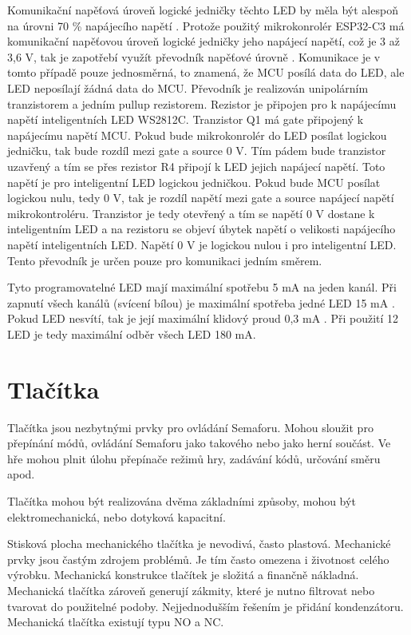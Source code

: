 Komunikační napěťová úroveň logické jedničky těchto LED by měla být alespoň na úrovni 70 \% napájecího napětí \cite{WS2812C_dtsh}. 
Protože použitý mikrokonrolér ESP32-C3 má komunikační napěťovou úroveň logické jedničky jeho napájecí napětí, což je 3 až 3,6 V, 
tak je zapotřebí využít převodník napěťové úrovně \cite{ESP_C3_dtsh}. Komunikace je v tomto případě pouze jednosměrná, 
to znamená, že MCU posílá data do LED, ale LED neposílají žádná data do MCU. Převodník je realizován unipolárním tranzistorem 
a jedním pullup rezistorem. Rezistor je připojen pro k napájecímu napětí inteligentních LED WS2812C. 
Tranzistor Q1 má gate připojený k napájecímu napětí MCU. Pokud bude mikrokonrolér do LED posílat logickou jedničku, tak bude rozdíl
mezi gate a source 0 V. Tím pádem bude tranzistor uzavřený a tím se přes rezistor R4 připojí k LED jejich napájecí napětí. Toto napětí 
je pro inteligentní LED logickou jedničkou. Pokud bude MCU posílat logickou nulu, tedy 0 V, tak je rozdíl napětí mezi gate a source 
napájecí napětí mikrokontroléru. Tranzistor je tedy otevřený a tím se napětí 0 V dostane k inteligentním LED a na rezistoru se objeví
úbytek napětí o velikosti napájecího napětí inteligentních LED. Napětí 0 V je logickou nulou i pro inteligentní LED. Tento převodník
je určen pouze pro komunikaci jedním směrem. 


Tyto programovatelné LED mají maximální spotřebu 5 mA na jeden kanál. Při zapnutí všech kanálů (svícení bílou) je maximální
spotřeba jedné LED 15 mA \cite{WS2812C_dtsh}. Pokud LED nesvítí, tak je její maximální klidový proud 0,3 mA \cite{WS2812C_dtsh}.
Při použití 12 LED je tedy maximální odběr všech LED 180 mA.




\section{Tlačítka}
Tlačítka jsou nezbytnými prvky pro ovládání Semaforu. Mohou sloužit pro přepínání módů, ovládání Semaforu jako takového nebo jako herní 
součást. Ve hře mohou plnit úlohu přepínače režimů hry, zadávání kódů, určování směru apod. 

Tlačítka mohou být realizována dvěma základními způsoby, mohou být elektromechanická, nebo dotyková kapacitní. 

Stisková plocha mechanického tlačítka je nevodivá, často plastová. Mechanické prvky jsou častým zdrojem problémů. Je tím často omezena i 
životnost celého výrobku. Mechanická konstrukce tlačítek je složitá a finančně nákladná. Mechanická tlačítka zároveň generují zákmity, které 
je nutno filtrovat nebo tvarovat do použitelné podoby. Nejjednodušším řešením je přidání kondenzátoru. Mechanická tlačítka existují typu NO 
a NC. 

